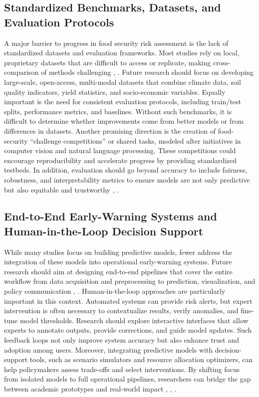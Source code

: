 \documentclass[preprint,12pt]{elsarticle}
\begin{document}
	\subsection{Standardized Benchmarks, Datasets, and Evaluation Protocols}
	
	A major barrier to progress in food security risk assessment is the lack
	of standardized datasets and evaluation frameworks. Most studies rely on
	local, proprietary datasets that are difficult to access or replicate,
	making cross-comparison of methods challenging \cite{ref64}, \cite{ref66}. Future
	research should focus on developing large-scale, open-access,
	multi-modal datasets that combine climate data, soil quality indicators,
	yield statistics, and socio-economic variables. Equally important is the
	need for consistent evaluation protocols, including train/test splits,
	performance metrics, and baselines. Without such benchmarks, it is
	difficult to determine whether improvements come from better models or
	from differences in datasets. Another promising direction is the
	creation of food-security ``challenge competitions'' or shared tasks,
	modeled after initiatives in computer vision and natural language
	processing. These competitions could encourage reproducibility and
	accelerate progress by providing standardized testbeds. In addition,
	evaluation should go beyond accuracy to include fairness, robustness,
	and interpretability metrics to ensure models are not only predictive
	but also equitable and trustworthy \cite{ref64}, \cite{ref66}.
	
	\subsection{End-to-End Early-Warning Systems and Human-in-the-Loop Decision Support}
	
	While many studies focus on building predictive models, fewer address
	the integration of these models into operational early-warning systems.
	Future research should aim at designing end-to-end pipelines that cover
	the entire workflow from data acquisition and preprocessing to
	prediction, visualization, and policy communication \cite{ref67}, \cite{ref68}.
	Human-in-the-loop approaches are particularly important in this context.
	Automated systems can provide risk alerts, but expert intervention is
	often necessary to contextualize results, verify anomalies, and
	fine-tune model thresholds. Research should explore interactive
	interfaces that allow experts to annotate outputs, provide corrections,
	and guide model updates. Such feedback loops not only improve system
	accuracy but also enhance trust and adoption among users. Moreover,
	integrating predictive models with decision-support tools, such as
	scenario simulators and resource allocation optimizers, can help
	policymakers assess trade-offs and select interventions. By shifting
	focus from isolated models to full operational pipelines, researchers
	can bridge the gap between academic prototypes and real-world impact
	\cite{ref67}, \cite{ref68}, \cite{ref83}.
	
\end{document}
